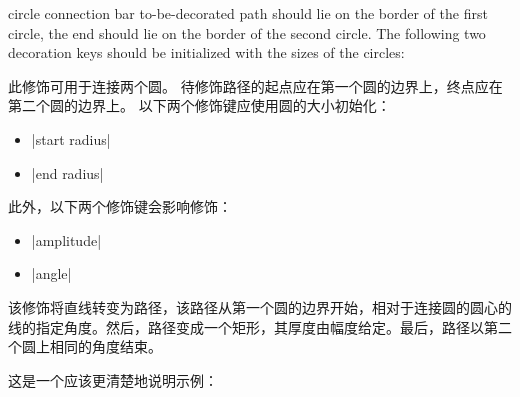 \begin{decoration}{circle connection bar}
    to-be-decorated path should lie on the border of the first circle, the end should lie on the border of the second circle. The following two decoration keys should be initialized with the sizes of the circles:

    此修饰可用于连接两个圆。 待修饰路径的起点应在第一个圆的边界上，终点应在第二个圆的边界上。 以下两个修饰键应使用圆的大小初始化：
    \begin{itemize}
        \item |start radius|
        \item |end radius|
    \end{itemize}
    此外，以下两个修饰键会影响修饰：
    \begin{itemize}
        \item |amplitude|
        \item |angle|
    \end{itemize}

    该修饰将直线转变为路径，该路径从第一个圆的边界开始，相对于连接圆的圆心的线的指定角度。然后，路径变成一个矩形，其厚度由幅度给定。最后，路径以第二个圆上相同的角度结束。


    这是一个应该更清楚地说明示例：
\begin{codeexample}[preamble={\usetikzlibrary{mindmap}}]
\end{codeexample}



\end{decoration}
